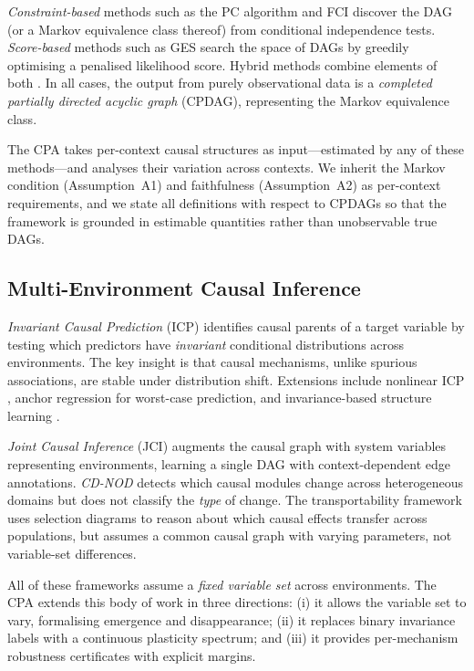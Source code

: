 \documentclass[11pt,a4paper]{article}
\theoremstyle{definition}
\begin{document}
\emph{Constraint-based} methods such as the PC algorithm
\citep{spirtes2000causation} and FCI
\citep{spirtes2000causation,zhang2008completeness} discover the DAG (or a
Markov equivalence class thereof) from conditional independence tests.
\emph{Score-based} methods such as GES \citep{chickering2002optimal}
search the space of DAGs by greedily optimising a penalised likelihood
score.  Hybrid methods combine elements of both
\citep{tsamardinos2006max}.  In all cases, the output from purely
observational data is a \emph{completed partially directed acyclic graph}
(CPDAG), representing the Markov equivalence class.

The CPA takes per-context causal structures as input---estimated by any
of these methods---and analyses their variation across contexts.  We
inherit the Markov condition (Assumption~A1) and faithfulness
(Assumption~A2) as per-context requirements, and we state all definitions
with respect to CPDAGs so that the framework is grounded in estimable
quantities rather than unobservable true DAGs.

\subsection{Multi-Environment Causal Inference}

\emph{Invariant Causal Prediction} (ICP) \citep{peters2016causal}
identifies causal parents of a target variable by testing which predictors
have \emph{invariant} conditional distributions across environments.  The
key insight is that causal mechanisms, unlike spurious associations, are
stable under distribution shift.  Extensions include nonlinear ICP
\citep{heinzedeml2018invariant}, anchor regression
\citep{rothenhausler2021anchor} for worst-case prediction, and
invariance-based structure learning \citep{pfister2019invariant}.

\emph{Joint Causal Inference} (JCI) \citep{mooij2020joint} augments the
causal graph with system variables representing environments, learning a
single DAG with context-dependent edge annotations.  \emph{CD-NOD}
\citep{huang2020causal} detects which causal modules change across
heterogeneous domains but does not classify the \emph{type} of change.
The transportability framework
\citep{bareinboim2014transportability,pearl2014external} uses selection
diagrams to reason about which causal effects transfer across populations,
but assumes a common causal graph with varying parameters, not
variable-set differences.

All of these frameworks assume a \emph{fixed variable set} across
environments.  The CPA extends this body of work in three directions: (i)
it allows the variable set to vary, formalising emergence and
disappearance; (ii) it replaces binary invariance labels with a continuous
plasticity spectrum; and (iii) it provides per-mechanism robustness
certificates with explicit margins.
\end{document}

